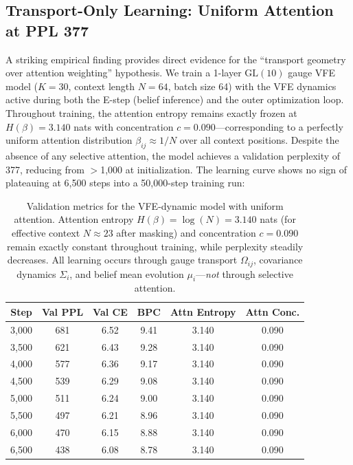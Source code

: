 \documentclass[twoside,11pt]{article}
\begin{document}
\subsection{Transport-Only Learning: Uniform Attention at PPL 377}
\label{sec:uniform_attention}

A striking empirical finding provides direct evidence for the ``transport geometry over attention weighting'' hypothesis. We train a 1-layer $\mathrm{GL}(10)$ gauge VFE model ($K = 30$, context length $N = 64$, batch size 64) with the VFE dynamics active during both the E-step (belief inference) and the outer optimization loop. Throughout training, the attention entropy remains exactly frozen at $H(\beta) = 3.140$ nats with concentration $c = 0.090$---corresponding to a perfectly uniform attention distribution $\beta_{ij} \approx 1/N$ over all context positions. Despite the absence of any selective attention, the model achieves a validation perplexity of 377, reducing from $>$1{,}000 at initialization. The learning curve shows no sign of plateauing at 6{,}500 steps into a 50{,}000-step training run:

\begin{table}[h]
\centering
\begin{tabular}{cccccc}
\hline
\textbf{Step} & \textbf{Val PPL} & \textbf{Val CE} & \textbf{BPC} & \textbf{Attn Entropy} & \textbf{Attn Conc.} \\
\hline
3{,}000 & 681 & 6.52 & 9.41 & 3.140 & 0.090 \\
3{,}500 & 621 & 6.43 & 9.28 & 3.140 & 0.090 \\
4{,}000 & 577 & 6.36 & 9.17 & 3.140 & 0.090 \\
4{,}500 & 539 & 6.29 & 9.08 & 3.140 & 0.090 \\
5{,}000 & 511 & 6.24 & 9.00 & 3.140 & 0.090 \\
5{,}500 & 497 & 6.21 & 8.96 & 3.140 & 0.090 \\
6{,}000 & 470 & 6.15 & 8.88 & 3.140 & 0.090 \\
6{,}500 & 438 & 6.08 & 8.78 & 3.140 & 0.090 \\
\hline
\end{tabular}
\caption{Validation metrics for the VFE-dynamic model with uniform attention. Attention entropy $H(\beta) = \log(N) = 3.140$ nats (for effective context $N \approx 23$ after masking) and concentration $c = 0.090$ remain exactly constant throughout training, while perplexity steadily decreases. All learning occurs through gauge transport $\Omega_{ij}$, covariance dynamics $\Sigma_i$, and belief mean evolution $\mu_i$---\emph{not} through selective attention.}
\label{tab:uniform_attention}
\end{table}
\end{document}
